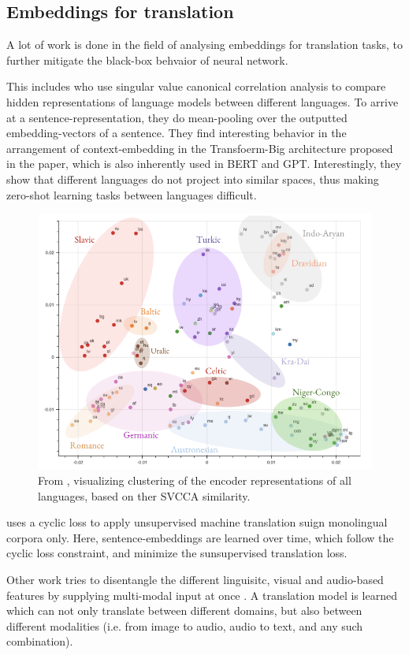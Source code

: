\documentclass[a4paper,12pt,twoside,openright]{report}
\begin{document}
\subsection{Embeddings for translation}

A lot of work is done in the field of analysing embeddings for translation tasks, to further mitigate the black-box behvaior of neural network.

This includes \cite{kudugunta18} who use singular value canonical correlation analysis to compare hidden representations of language models between different languages.
To arrive at a sentence-representation, they do mean-pooling over the outputted embedding-vectors of a sentence. 
They find interesting behavior in the arrangement of context-embedding in the Transfoerm-Big architecture proposed in the \cite{vaswani17} paper, which is also inherently used in BERT and GPT.
Interestingly, they show that different languages do not project into similar spaces, thus making zero-shot learning tasks between languages difficult.


\begin{figure}[h]
	\center
  \includegraphics[width=0.6\linewidth]{./assets/relatedwork/embeddings_by_language.png}
  \caption{From \cite{kudugunta18}, visualizing clustering of the encoder representations of all languages, based on ther SVCCA similarity.}
  \label{fig:embeddings_by_language}
\end{figure}



\cite{lample18} uses a cyclic loss to apply unsupervised machine translation suign monolingual corpora only. 
Here, sentence-embeddings are learned over time, which follow the cyclic loss constraint, and minimize the sunsupervised translation loss.

Other work tries to disentangle the different linguisitc, visual and audio-based features by supplying multi-modal input at once \cite{ma19}.
A translation model is learned which can not only translate between different domains, but also between different modalities (i.e. from image to audio, audio to text, and any such combination).
\end{document}
